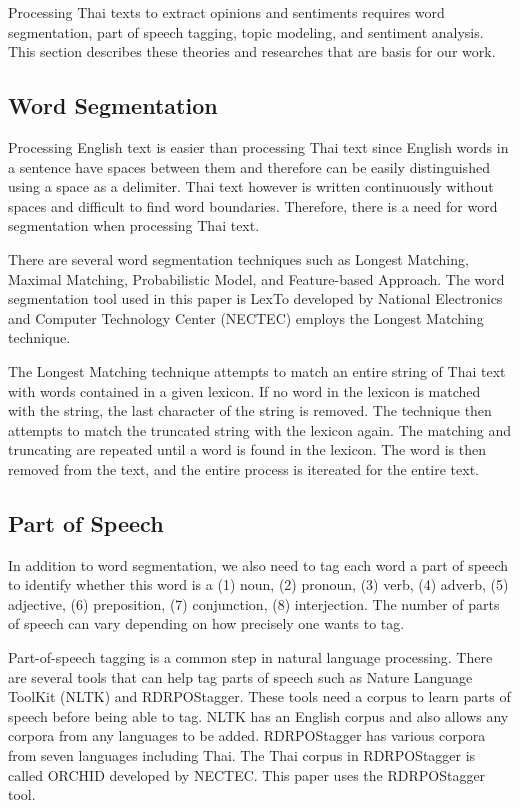 Processing Thai texts to extract opinions and sentiments requires word segmentation, part of speech tagging, topic modeling, and sentiment analysis. This section describes these theories and researches that are basis for our work. 

\subsection{Word Segmentation}

Processing English text is easier than processing Thai text since English words in a sentence have spaces between them and therefore can be easily distinguished using a space as a delimiter. Thai text however is written continuously without spaces and difficult to find word boundaries. Therefore, there is a need for word segmentation when processing Thai text.

There are several word segmentation techniques such as Longest Matching\cite{syllableseparator}, Maximal Matching\cite{wordsegforthai}, Probabilistic Model\cite{thaiwordfilter}, and Feature-based Approach\cite{featurethaiwordseg}. The word segmentation tool used in this paper is LexTo\cite{LexTo} developed by National Electronics and Computer Technology Center (NECTEC) employs the Longest Matching technique. 

The Longest Matching technique attempts to match an entire string of Thai text with words contained in a given lexicon. If no word in the lexicon is matched with the string, the last character of the string is removed. The technique then attempts to match the truncated string with the lexicon again. The matching and truncating are repeated until a word is found in the lexicon. The word is then removed from the text, 
and the entire process is itereated for the entire text.

\subsection{Part of Speech}

In addition to word segmentation, we also need to tag each word a part of speech to identify whether this word is a (1) noun, (2) pronoun, (3) verb, (4) adverb, (5) adjective, (6) preposition, (7) conjunction, (8) interjection. The number of parts of speech can vary depending on how precisely one wants to tag.

Part-of-speech tagging is a common step in natural language processing. There are several tools that can help tag parts of speech such as Nature Language ToolKit (NLTK)\cite{NLTK} and RDRPOStagger\cite{RDRPOSTagger}. These tools need a corpus to learn parts of speech before being able to tag. NLTK has an English corpus and also allows any corpora from any languages to be added. RDRPOStagger has various corpora from seven languages including Thai. The Thai corpus in RDRPOStagger is called ORCHID\cite{ORCHID} developed by NECTEC. This paper uses the RDRPOStagger tool.

